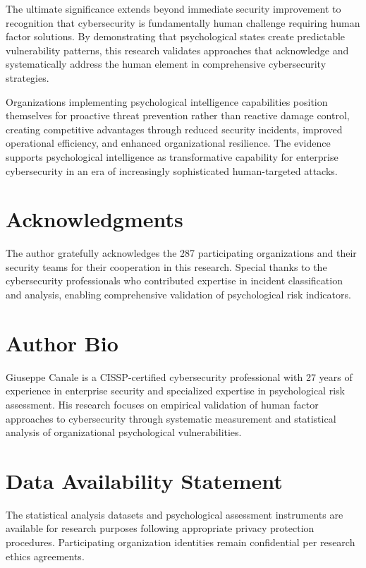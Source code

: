 \documentclass[10pt, twocolumn]{article}
\begin{document}
The ultimate significance extends beyond immediate security improvement to recognition that cybersecurity is fundamentally human challenge requiring human factor solutions. By demonstrating that psychological states create predictable vulnerability patterns, this research validates approaches that acknowledge and systematically address the human element in comprehensive cybersecurity strategies.

Organizations implementing psychological intelligence capabilities position themselves for proactive threat prevention rather than reactive damage control, creating competitive advantages through reduced security incidents, improved operational efficiency, and enhanced organizational resilience. The evidence supports psychological intelligence as transformative capability for enterprise cybersecurity in an era of increasingly sophisticated human-targeted attacks.

\section*{Acknowledgments}

The author gratefully acknowledges the 287 participating organizations and their security teams for their cooperation in this research. Special thanks to the cybersecurity professionals who contributed expertise in incident classification and analysis, enabling comprehensive validation of psychological risk indicators.

\section*{Author Bio}

Giuseppe Canale is a CISSP-certified cybersecurity professional with 27 years of experience in enterprise security and specialized expertise in psychological risk assessment. His research focuses on empirical validation of human factor approaches to cybersecurity through systematic measurement and statistical analysis of organizational psychological vulnerabilities.

\section*{Data Availability Statement}

The statistical analysis datasets and psychological assessment instruments are available for research purposes following appropriate privacy protection procedures. Participating organization identities remain confidential per research ethics agreements.
\end{document}
